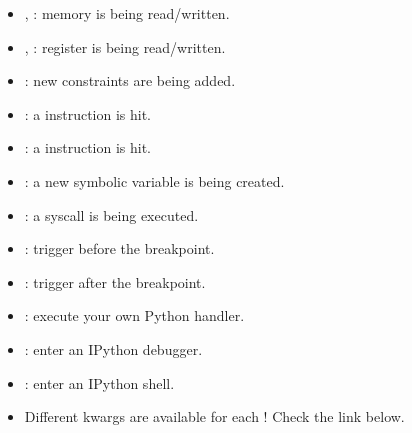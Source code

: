 \documentclass[xcolor={dvipsnames}]{beamer}
\begin{document}
\begin{frame}[fragile]{}
    \footnotesize
    \begin{block}{}
        \begin{itemize}
            \item {}, : memory is being read/written.
            \item {}, : register is being read/written.
            \item {}: new constraints are being added.
            \item {}: a  instruction is hit.
            \item {}: a  instruction is hit.
            \item {}: a new symbolic variable is being created.
            \item {}: a syscall is being executed.
        \end{itemize}
    \end{block}
\end{frame}
\begin{frame}[fragile]{}
    \footnotesize
    \begin{block}{}
        \begin{itemize}
            \item {}: trigger before the breakpoint.
            \item {}: trigger after the breakpoint.
        \end{itemize}
    \end{block}
    \begin{block}{}
        \begin{itemize}
            \item {}: execute your own Python handler.
            \item {}: enter an IPython debugger.
            \item {}: enter an IPython shell.
        \end{itemize}
    \end{block}
    \begin{block}{}
        \begin{itemize}
            \item Different kwargs are available for each ! Check the link below.
        \end{itemize}
    \end{block}
\end{frame}
\end{document}
